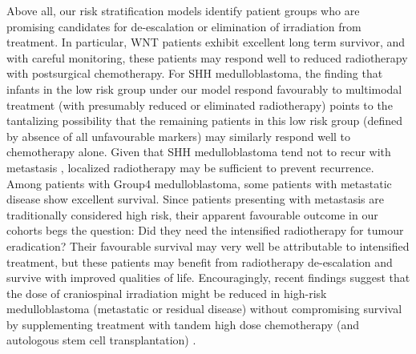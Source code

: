 Above all, our risk stratification models identify patient groups who are promising candidates for de-escalation or elimination of irradiation from treatment. In particular, WNT patients exhibit excellent long term survivor, and with careful monitoring, these patients may respond well to reduced radiotherapy with postsurgical chemotherapy. For SHH medulloblastoma, the finding that infants in the low risk group under our model respond favourably to multimodal treatment (with presumably reduced or eliminated radiotherapy) points to the tantalizing possibility that the remaining patients in this low risk group (defined by absence of all unfavourable markers) may similarly respond well to chemotherapy alone. Given that SHH medulloblastoma tend not to recur with metastasis , localized radiotherapy may be sufficient to prevent recurrence. Among patients with Group4 medulloblastoma, some patients with metastatic disease show excellent survival. Since patients presenting with metastasis are traditionally considered high risk, their apparent favourable outcome in our cohorts begs the question: Did they need the intensified radiotherapy for tumour eradication? Their favourable survival may very well be attributable to intensified treatment, but these patients may benefit from radiotherapy de-escalation and survive with improved qualities of life. Encouragingly, recent findings suggest that the dose of craniospinal irradiation might be reduced in high-risk medulloblastoma (metastatic or residual disease) without compromising survival by supplementing treatment with tandem high dose chemotherapy (and autologous stem cell transplantation) .

